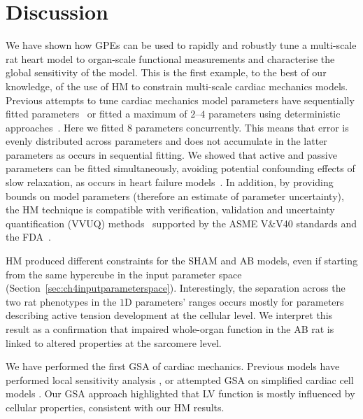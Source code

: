 %
%
%
\section{Discussion}\label{sec:ch4discussion}
We have shown how GPEs can be used to rapidly and robustly tune a multi-scale rat heart model to organ-scale functional measurements and characterise the global sensitivity of the model. This is the first example, to the best of our knowledge, of the use of HM to constrain multi-scale cardiac mechanics models. Previous attempts to tune cardiac mechanics model parameters have sequentially fitted parameters~\cite{Wang:2009} or fitted a maximum of $2$--$4$ parameters using deterministic approaches~\cite{Lewalle:2018}. Here we fitted $8$ parameters concurrently. This means that error is evenly distributed across parameters and does not accumulate in the latter parameters as occurs in sequential fitting. We showed that active and passive parameters can be fitted simultaneously, avoiding potential confounding effects of slow relaxation, as occurs in heart failure models~\cite{Xi:2013}. In addition, by providing bounds on model parameters (therefore an estimate of parameter uncertainty), the HM technique is compatible with verification, validation and uncertainty quantification (VVUQ) methods~\cite{Patten:2009} supported by the ASME V$\&$V40 standards and the FDA~\cite{Asme:2019}.

\vspace{0.2cm}
HM produced different constraints for the SHAM and AB models, even if starting from the same hypercube in the input parameter space (Section~\ref{sec:ch4inputparameterspace}). Interestingly, the separation across the two rat phenotypes in the $1$D parameters' ranges occurs mostly for parameters describing active tension development at the cellular level. We interpret this result as a confirmation that impaired whole-organ function in the AB rat is linked to altered properties at the sarcomere level.

\vspace{0.2cm}
We have performed the first GSA of cardiac mechanics. Previous models have performed local sensitivity analysis \cite{Sher:2013}, or attempted GSA on simplified cardiac cell models \cite{Pathmanathan:2019}. Our GSA approach highlighted that LV function is mostly influenced by cellular properties, consistent with our HM results.


%
%
%
